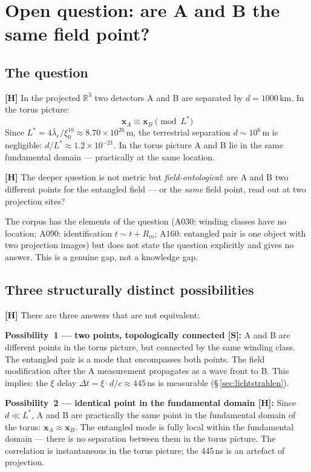 \section{Open question: are A and B the same field point?}
\label{sec:identischer_punkt}

\subsection{The question}

\textbf{[H]} In the projected $\mathbb{R}^3$ two detectors A and B
are separated by $d = 1000$\,km. In the torus picture:
\[
  \mathbf{x}_A \equiv \mathbf{x}_B \pmod{L^*}
\]
Since $L^* = 4\bar\lambda_e/\xi_0^{10} \approx 8{.}70 \times 10^{26}$\,m,
the terrestrial separation $d \sim 10^6$\,m is negligible:
$d/L^* \approx 1{.}2\times10^{-21}$. In the torus picture A and B lie in the
same fundamental domain --- practically at the same location.

\textbf{[H]} The deeper question is not metric but
\emph{field-ontological}: are A and B two different points for the
entangled field --- or the \emph{same} field point, read out at two
projection sites?

The corpus has the elements of the question (A030: winding classes
have no location; A090: identification $t \sim t + R_m$; A160:
entangled pair is one object with two projection images) but does not
state the question explicitly and gives no answer. This is a genuine
gap, not a knowledge gap.

\subsection{Three structurally distinct possibilities}

\textbf{[H]} There are three answers that are not equivalent:

\textbf{Possibility~1 --- two points, topologically connected [S]:}
A and B are different points in the torus picture, but connected by
the same winding class. The entangled pair is a mode that encompasses
both points. The field modification after the A measurement propagates
as a wave front to B. This implies: the $\xi$ delay
$\Delta t = \xi \cdot d/c \approx 445$\,ns is measurable
(§\,\ref{sec:lichtstrahlen}).

\textbf{Possibility~2 --- identical point in the fundamental domain [H]:}
Since $d \ll L^*$, A and B are practically the same point in the
fundamental domain of the torus: $\mathbf{x}_A \approx \mathbf{x}_B$.
The entangled mode is fully local within the fundamental domain ---
there is no separation between them in the torus picture. The
correlation is instantaneous in the torus picture; the 445\,ns is
an artefact of projection.

